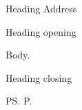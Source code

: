 \documentclass[12pt]{scrlttr2}
\date{2026-09-28}
\begin{document}

\begin{letter}{%
Heading Address}

\opening{Heading opening}

Body.
\closing{Heading closing}

\ps{P.}

\end{letter}
\end{document}
